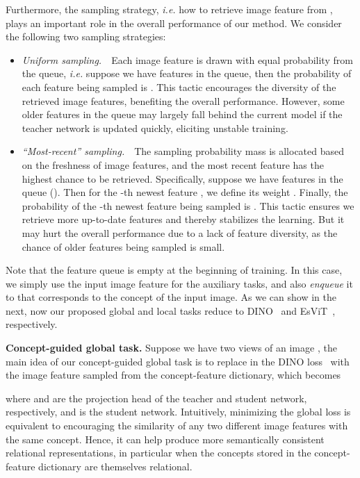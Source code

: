 \documentclass{article} \usepackage{iclr2022_conference,times}
\renewcommand{\paragraph}[1]{\noindent\textbf{#1.}}
\begin{document}
Furthermore, the sampling strategy, \emph{i.e.} how to retrieve image feature  from , plays an important role in the overall performance of our method. We consider the following two sampling strategies:
\setlength{\leftmargini}{1.5em}
\begin{itemize}[noitemsep,topsep=0pt]
    \item \textit{Uniform sampling.}~~Each image feature is drawn with equal probability from the queue, \emph{i.e.} suppose we have  features in the queue, then the probability of each feature being sampled is . This tactic encourages the diversity of the retrieved image features, benefiting the overall performance. However, some older features in the queue may largely fall behind the current model if the teacher network  is updated quickly, eliciting unstable training.
    \vspace{3pt}
    \item \textit{``Most-recent'' sampling.}~~The sampling probability mass is allocated based on the freshness of image features, and the most recent feature has the highest chance to be retrieved. Specifically, suppose we have  features in the queue  (). Then for the -th newest feature , we define its weight . Finally, the probability of the -th newest feature being sampled is . This tactic ensures we retrieve more up-to-date features and thereby stabilizes the learning. But it may hurt the overall performance due to a lack of feature diversity, as the chance of older features being sampled is small.
\end{itemize}
Note that the feature queue is empty at the beginning of training. In this case, we simply use the input image feature  for the auxiliary tasks, and also \emph{enqueue} it to  that corresponds to the concept of the input image.
As we can show in the next, now our proposed global and local tasks reduce to DINO~\citep{dino} and EsViT~\citep{esvit}, respectively. 

\paragraph{Concept-guided global task}
Suppose we have two views  of an image , 
the main idea of our concept-guided global task is to replace  in the DINO loss~\citep{dino} with the image feature  sampled from the concept-feature dictionary, which becomes
\vskip -0.25in

\vskip -0.15in
where  and  are the projection head of the teacher and student network, respectively, and  is the student network. Intuitively, minimizing the global loss is equivalent to encouraging the similarity of any two different image features with the same concept. Hence, it can help produce more semantically consistent relational representations, in particular when the concepts stored in the concept-feature dictionary are themselves relational. 
\end{document}

